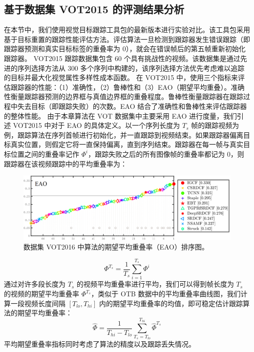 \subsection{基于数据集 VOT2015 的评测结果分析}
在本节中，我们使用视觉目标跟踪工具包的最新版本进行实验对比。该工具包采用基于目标重置的跟踪性能评估方法。评估算法一旦检测到跟踪器发生错误跟踪（即跟踪器预测和真实目标标签的重叠率为 0），就会在错误帧后的第五帧重新初始化跟踪器。
VOT2015 \cite{Kristan2015TheVO} 跟踪数据集包含 60 个具有挑战性的视频。该数据集是通过先进的序列选择方法从 300 多个序列中构建的，该序列选择方法优先考虑难以追踪的目标并最大化视觉属性多样性成本函数。
在 VOT2015 中，使用三个指标来评估跟踪器的性能：（1）准确性，（2）鲁棒性和（3）EAO（期望平均重叠）。准确性衡量跟踪器预测的边界框与真值边界框的重叠程度。鲁棒性衡量跟踪器在跟踪过程中失去目标（即跟踪失败）的次数。EAO 结合了准确性和鲁棒性来评估跟踪器的整体性能。
由于本章算法在 VOT 数据集中主要采用 EAO 进行度量，我们引述 VOT2015 中对于 EAO 的具体定义。以一个序列长度为 $T_s$ 帧的跟踪视频为例，跟踪算法在序列首帧进行初始化，并一直跟踪到视频结束。如果跟踪器偏离目标真实位置，则假定它将一直保持偏离，直到序列结束。跟踪器在每一帧与真实目标位置之间的重叠率记作 $\Phi^i$，跟踪失败之后的所有图像帧的重叠率都记为 0，则跟踪器在该视频跟踪中的平均重叠率为：
\begin{figure}[t]
    \centering
    \includegraphics[width=1.0\textwidth]{Img/IGCF/vot/eao_rank_vot2016.png}
    \caption{数据集 VOT2016 \cite{Kristan2016TheVO} 中算法的期望平均重叠率（EAO）排序图。}
    \label{fig:vot16}
\end{figure}
\begin{equation}
\Phi^{T_{s}}=\frac{1}{T_{s}} \sum_{i=1}^{T_{s}} \Phi^{i}
\end{equation}
通过对许多段长度为 $T_s$ 的视频平均重叠率进行平均，我们可以得到帧长度为 $T_s$ 的视频的期望平均重叠率 $\Phi^{T_{s}}$，类似于 OTB 数据中的平均重叠率曲线图，我们计算一段视频长度间隔 $[T_{lo}, T_{hi}]$ 内的期望平均重叠率的均值，即可稳定估计跟踪算法的期望平均重叠率：
\begin{equation}
\hat{\Phi}=\frac{1}{T_{h i}-T_{l o}} \sum_{T_{s}=T_{l o}}^{T_{h i}} \hat{\Phi}^{T_{s}}
\end{equation}
平均期望重叠率指标同时考虑了算法的精度以及跟踪丢失情况。

